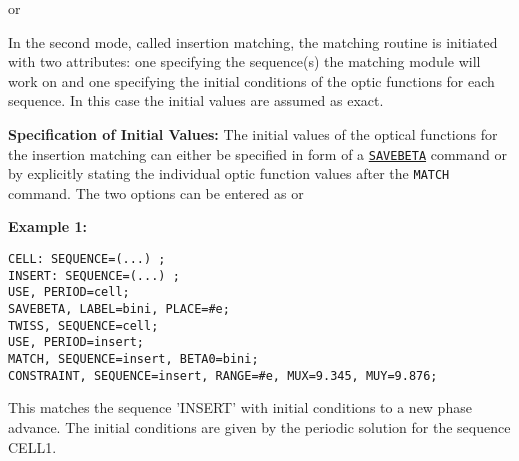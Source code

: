 
or


In the second mode, called insertion matching, the matching routine is
initiated with two attributes: one specifying the sequence(s) the
matching module will work on and one specifying the initial conditions
of the optic functions for each sequence. In this case the initial
values are assumed as exact. 
    
{\bf Specification of Initial Values:}
The initial values of the optical
functions  for the insertion matching can either be specified in form of
a \hyperref[sec:savebeta]{\tt SAVEBETA} command or by
explicitly stating the individual optic function values after the
{\tt MATCH} command. The two options can be entered as         
or

{\bf Example 1:}   
\begin{verbatim}
CELL: SEQUENCE=(...) ;
INSERT: SEQUENCE=(...) ;
USE, PERIOD=cell;
SAVEBETA, LABEL=bini, PLACE=#e;
TWISS, SEQUENCE=cell;
USE, PERIOD=insert;
MATCH, SEQUENCE=insert, BETA0=bini;
CONSTRAINT, SEQUENCE=insert, RANGE=#e, MUX=9.345, MUY=9.876;
\end{verbatim}

This matches the sequence 'INSERT' with initial conditions to a new
phase advance. The initial conditions are given by the periodic solution
for the sequence CELL1. 
    
